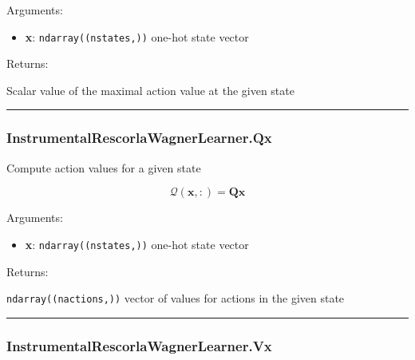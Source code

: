 Arguments:

\begin{itemize}
\tightlist
\item
  \textbf{x}: \texttt{ndarray((nstates,))} one-hot state vector
\end{itemize}

Returns:

Scalar value of the maximal action value at the given state

\begin{center}\rule{0.5\linewidth}{\linethickness}\end{center}

\subsubsection{InstrumentalRescorlaWagnerLearner.Qx}\label{instrumentalrescorlawagnerlearner.qx}

\begin{Shaded}
\begin{Highlighting}[]
\end{Highlighting}
\end{Shaded}

Compute action values for a given state

\[
\mathcal Q(\mathbf x, :) = \mathbf Q \mathbf x
\]

Arguments:

\begin{itemize}
\tightlist
\item
  \textbf{x}: \texttt{ndarray((nstates,))} one-hot state vector
\end{itemize}

Returns:

\texttt{ndarray((nactions,))} vector of values for actions in the given
state

\begin{center}\rule{0.5\linewidth}{\linethickness}\end{center}

\subsubsection{InstrumentalRescorlaWagnerLearner.Vx}\label{instrumentalrescorlawagnerlearner.vx}

\begin{Shaded}
\begin{Highlighting}[]
\end{Highlighting}
\end{Shaded}

